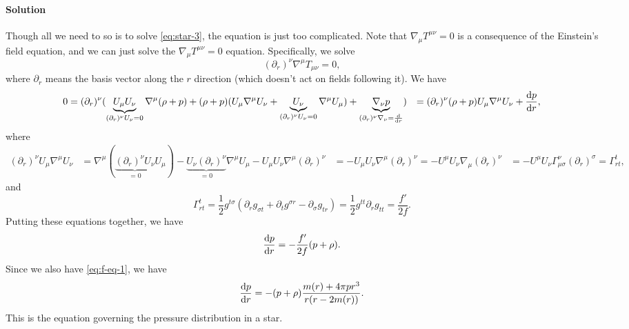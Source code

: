 \documentclass[hyperref, a4paper]{article}
\def\\{}%
\begin{document}
\paragraph{Solution} Though all we need to so is to solve \eqref{eq:star-3}, the equation is just too complicated.
Note that $\nabla_\mu T^{\mu \nu} = 0$ is a consequence of the Einstein's field equation, and we can just solve 
the $\nabla_\mu T^{\mu \nu} = 0$ equation. Specifically, we solve 
\[
    (\partial_r)^\nu \nabla^\mu T_{\mu \nu} = 0,
\] 
where $\partial_r$ means the basis vector along the $r$ direction (which doesn't act on fields following it). We have 
\[
    \begin{aligned}
        0 &= (\partial_r)^\nu ( \underbrace{U_\mu U_\nu}_{(\partial_r)^\nu U_\nu = 0} \nabla^\mu (\rho + p) + (\rho + p) (U_\mu \nabla^\mu U_\nu + \underbrace{U_\nu}_{(\partial_r)^\nu U_\nu = 0} \nabla^\mu U_\mu) + \underbrace{\nabla_\nu p}_{(\partial_r)^\nu \nabla_\nu = \dv{r}} ) \\
        &= (\partial_r)^\nu (\rho + p) U_\mu \nabla^\mu U_\nu + \dv{p}{r} ,
    \end{aligned}
\]
where 
\[
    \begin{aligned}
        (\partial_r)^\nu U_\mu \nabla^\mu U_\nu &= \nabla^\mu (\underbrace{(\partial_r)^\nu U_\nu}_{=0} U_\mu) - \underbrace{U_\nu (\partial_r)^\nu}_{= 0 } \nabla^\mu U_\mu - U_\mu U_\nu \nabla^\mu (\partial_r)^\nu \\
        &= - U_\mu U_\nu \nabla^\mu (\partial_r)^\nu = - U^\mu U_\nu \nabla_\mu (\partial_r)^\nu \\
        &= - U^\mu U_\nu \Gamma_{\mu \sigma}^\nu (\partial_r)^\sigma = \Gamma^t_{r t} ,
    \end{aligned}
\]
and 
\[
    \Gamma^t_{rt} = \frac{1}{2} g^{t \sigma} (\partial_r g_{\sigma t} + \partial_t g^{\sigma r} - \partial_\sigma g_{tr} ) = \frac{1}{2} g^{tt} \partial_r g_{tt} = \frac{f'}{2f}.
\]
Putting these equations together, we have 
\begin{equation}
    \dv{p}{r} = - \frac{f'}{2f} (p + \rho).
\end{equation}
Since we also have \eqref{eq:f-eq-1}, we have 
\begin{equation}
    \dv{p}{r} = - (p + \rho) \frac{m(r) + 4 \pi p r^3}{r (r - 2m(r))}.
\end{equation}
This is the equation governing the pressure distribution in a star.



\end{document}
